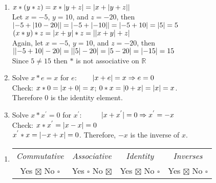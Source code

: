 \documentclass[12pt]{article}
\DeclarePairedDelimiter{\abs}{\lvert}{\rvert}
\begin{document}
\begin{flushleft}
\begin{enumerate}
\item 
$x * (y * z) = x * \abs{y + z} = \abs{x + \abs{y + z}}$ \\
Let $x = -5$, $ y = 10$, and $z = -20$, then \\
$\abs{-5 + \abs{10-20}} = \abs{-5 + \abs{-10}} = \abs{-5 + 10} = \abs{5} = 5$ \\
$(x * y) * z = \abs{x + y} * z = \abs{\abs{x + y} + z}$ \\
Again, let $x = -5$, $ y = 10$, and $z = -20$, then \\
$\abs{\abs{-5 + 10}-20} = \abs{\abs{5}-20} = \abs{5-20} = \abs{-15} = 15$ \\
Since $5 \neq 15$ then $*$ is not associative on $\mathbb{R}$

\item Solve $x*e=x$ for $e$: ~~~ $\abs{x + e} = x \Rightarrow e = 0$ \\
Check: $x * 0 = \abs{x + 0} = x$; $0 * x = \abs{0 + x} = \abs{x} = x$. \\
Therefore $0$ is the identity element.

\item Solve $x * x^{'} = 0$ for $x^{'}$: ~~~~ $\abs{x + x^{'}} = 0 \Rightarrow x^{'} = -x$ \\
Check: $x * x^{'} = \abs{x - x} = 0$ \\
$x^{'} * x = \abs{-x + x} = 0$. Therefore, $-x$ is the inverse of $x$.

\end{enumerate}

\renewcommand{\theenumi}{\arabic{enumi}}
\begin{enumerate}\addtocounter{enumi}{2}

\item 
\begin{tabular}{c c c c}
\textit{Commutative} & \textit{Associative} & \textit{Identity} & \textit{Inverses} \\
Yes $\boxtimes$ No $\square$ & Yes $\square$ No $\boxtimes$ & Yes $\boxtimes$ No $\square$ & Yes $\boxtimes$ No $\square$ \\
\end{tabular}
\end{enumerate}









\end{flushleft}
\end{document}

